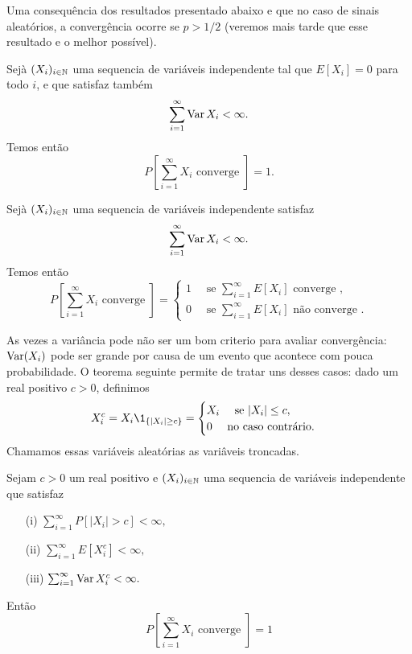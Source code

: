 \begin{topics}
\medskip

Uma consequência dos resultados presentado abaixo e que no caso de sinais aleatórios, a convergência ocorre se $p>1/2$
(veremos mais tarde que esse resultado e o melhor possível).


 

\begin{theorem}
 Sejà $(X_i)_{i\in {\ensuremath{\mathbb N}}}$ uma sequencia de variáveis independente tal que $E[X_i]=0$ para todo $i$,
 e que satisfaz também
 $$ \sum_{i=1}^\infty \operatorname{Var} X_i<\infty.$$
Temos então
\begin{equation}
P\left[\sum_{i=1}^{\infty} X_i \text{ converge } \right]=1.
\end{equation}
\end{theorem}

\medskip

\begin{theorem}
 Sejà $(X_i)_{i\in {\ensuremath{\mathbb N}}}$ uma sequencia de variáveis independente
satisfaz
 $$ \sum_{i=1}^\infty \operatorname{Var} X_i<\infty.$$
Temos então
\begin{equation}
P[\sum_{i=1}^{\infty} X_i \text{ converge } ]=\begin{cases} 1 \quad \text{ se } \sum_{i=1}^\infty E[X_i] \text{ converge },\\
                                                0   \quad \text{ se } \sum_{i=1}^\infty E[X_i] \text{ não converge }.
                                              \end{cases}
\end{equation}
\end{theorem}

As vezes a variância pode não ser um bom criterio para avaliar convergência: $\operatorname{Var}(X_i)$ pode ser grande por causa de um evento que 
acontece com pouca probabilidade. O teorema seguinte permite de tratar uns desses casos:
dado um real positivo $c>0$, definimos 
\begin{equation}
X_i^c= X_i \1_{\{|X_i| \ge c\}}= \begin{cases} X_i \quad \text{ se } |X_i|\le c,\\
                                    0 \quad \text{ no caso contrário.} 
                                   \end{cases}
           \end{equation}                        
Chamamos essas variáveis aleatórias as variâveis troncadas.

\begin{theorem}
 Sejam $c>0$ um real positivo e $(X_i)_{i\in {\ensuremath{\mathbb N}}}$ uma sequencia de variáveis independente que
satisfaz
\begin{itemize}
 \item [(i)]  $\sum_{i=1}^\infty P[ |X_i|>c ]<\infty,$
 \item [(ii)]  $\sum_{i=1}^\infty E[ X^c_i]<\infty,$
 \item [(iii)]  $\sum_{i=1}^\infty \operatorname{Var} X^c_i<\infty.$
\end{itemize}
Então
$$ P[\sum_{i=1}^{\infty} X_i \text{ converge } ]= 1 $$                                              
\end{theorem}




\end{topics}
